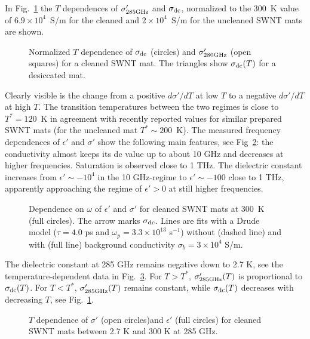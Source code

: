 \begin{multicols}{2}
In Fig.~\ref{fig1} the $T$ dependences of $\sigma'_{\rm 285 GHz}$ and
$\sigma_{\rm dc}$, normalized to the 300~K value of $6.9\times 10^4$~S/m for
the cleaned and $2\times 10^4$~S/m for the uncleaned SWNT mats are shown.
\begin{figure}[htb]
\begin{center}
\leavevmode
{}
\end{center}
\caption{Normalized $T$ dependence of $\sigma_{\rm dc}$ (circles) and $\sigma'_{280 {\rm GHz}}$ (open squares) for a cleaned SWNT mat. The triangles show $\sigma_{\rm dc}(T)$ for a desiccated mat.}
\label{fig1}
\end{figure}
Clearly visible is the change from a positive $d\sigma'/dT$ at low
$T$ to a negative $d\sigma'/dT$ at high $T$. The transition temperatures
between the two regimes is close to $T^*= 120$~K in agreement with recently
reported values for similar prepared SWNT mats\cite{Fischer97} (for the
uncleaned mat $T^* \sim 200$~K). The measured frequency dependences of
$\epsilon'$ and $\sigma'$ show the following main features, see
Fig~\ref{fig2}: the conductivity almost keeps its dc value up to about 10 GHz
and decreases at higher frequencies. Saturation is observed close to 1
THz. The dielectric constant increases from $\epsilon' \sim -10^4$
in the 10 GHz-regime to $\epsilon' \sim -100$ close to 1 THz, apparently
approaching the regime of $\epsilon'> 0$ at still higher frequencies.
\begin{figure}[htb]
\begin{center}
\leavevmode
{}
\end{center}
\caption{Dependence on $\omega$ of $\epsilon'$ and $\sigma'$ for cleaned SWNT mats at 300~K (full circles). The arrow marks $\sigma_{\rm dc}$. Lines are fits with a Drude model ($\tau= 4.0$ ps and $\omega_p = 3.3 \times 10^{13}$ s$^{-1}$) without (dashed line) and with (full line) background conductivity $\sigma_b = 3\times10^4$ S/m. }
\label{fig2}
\end{figure}
The dielectric constant at 285 GHz remains negative down to 2.7 K, see the
temperature-dependent data in Fig.~\ref{fig3}. For $T > T^*$, $\sigma'_{285 {\rm GHz}}(T)$ is proportional to $\sigma_{\rm dc}(T)$. For $T < T^*$,
$\sigma'_{285 {\rm GHz}}(T)$ remains constant, while $\sigma_{\rm dc}(T)$
decreases with decreasing $T$, see Fig.~\ref{fig1}.
\begin{figure}[htb]
\begin{center}
\leavevmode
{}
\end{center}
\caption{$T$ dependence of $\sigma'$ (open circles)and $\epsilon'$ (full circles) for cleaned SWNT mats between 2.7 K and 300 K at 285 GHz.}
\label{fig3}
\end{figure}


\end{multicols}
